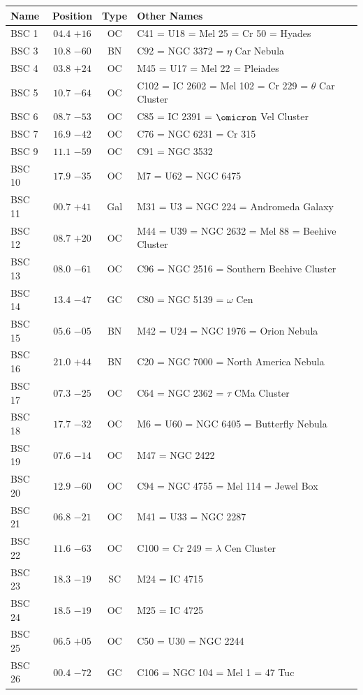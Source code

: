 
\begin{table}[t]
    \setlength{\tabcolsep}{2pt}
    \footnotesize
    \begin{tabularx}{\linewidth}{lccX}
        \hline
        Name&Position&Type&Other Names\\
        \hline

BSC 1 &$04.4$ $+16$&OC &C41 = U18 = Mel 25 = Cr 50 = Hyades\\
BSC 3 &$10.8$ $-60$&BN &C92 = NGC 3372 = $\eta$ Car Nebula\\
BSC 4 &$03.8$ $+24$&OC &M45 = U17 = Mel 22 = Pleiades\\
BSC 5 &$10.7$ $-64$&OC &C102 = IC 2602 = Mel 102 = Cr 229 = $\theta$ Car Cluster\\
BSC 6 &$08.7$ $-53$&OC &C85 = IC 2391 = $\omicron$ Vel Cluster\\
BSC 7 &$16.9$ $-42$&OC &C76 = NGC 6231 = Cr 315\\
BSC 9 &$11.1$ $-59$&OC &C91 = NGC 3532\\
BSC 10 &$17.9$ $-35$&OC &M7 = U62 = NGC 6475\\
BSC 11 &$00.7$ $+41$&Gal&M31 = U3 = NGC 224 = Andromeda Galaxy\\
BSC 12 &$08.7$ $+20$&OC &M44 = U39 = NGC 2632 = Mel 88 = Beehive Cluster\\
BSC 13 &$08.0$ $-61$&OC &C96 = NGC 2516 = Southern Beehive Cluster\\
BSC 14 &$13.4$ $-47$&GC &C80 = NGC 5139 = $\omega$ Cen\\
BSC 15 &$05.6$ $-05$&BN &M42 = U24 = NGC 1976 = Orion Nebula\\
BSC 16 &$21.0$ $+44$&BN &C20 = NGC 7000 = North America Nebula\\
BSC 17 &$07.3$ $-25$&OC &C64 = NGC 2362 = $\tau$ CMa Cluster\\
BSC 18 &$17.7$ $-32$&OC &M6 = U60 = NGC 6405 = Butterfly Nebula\\
BSC 19 &$07.6$ $-14$&OC &M47 = NGC 2422\\
BSC 20 &$12.9$ $-60$&OC &C94 = NGC 4755 = Mel 114 = Jewel Box\\
BSC 21 &$06.8$ $-21$&OC &M41 = U33 = NGC 2287\\
BSC 22 &$11.6$ $-63$&OC &C100 = Cr 249 = $\lambda$ Cen Cluster\\
BSC 23 &$18.3$ $-19$&SC &M24 = IC 4715\\
BSC 24 &$18.5$ $-19$&OC &M25 = IC 4725\\
BSC 25 &$06.5$ $+05$&OC &C50 = U30 = NGC 2244\\
BSC 26 &$00.4$ $-72$&GC &C106 = NGC 104 = Mel 1 = 47 Tuc\\

\end{tabularx}
\end{table}
